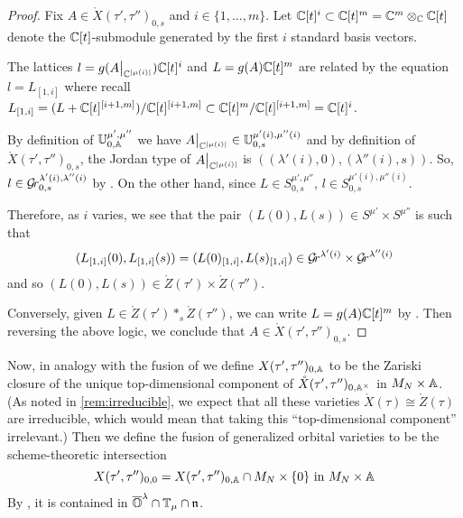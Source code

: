 \documentclass{article}
\begin{document}
\begin{proof}
% 
Fix $A\in \mathring X(\tau',\tau'')_{0,s} $ and $i \in \{1,\dots, m\}$. 
% 
Let $\CC[t]^i\subset\CC[t]^m = \CC^m\otimes_\CC\CC[t]$ denote the $\CC[t]$-submodule generated by the first $i$ standard basis vectors.

The lattices $l=g(A\big|_{\CC^{|\mu(i)|}})\CC[t]^i$ and $L=g(A)\CC[t]^m$ are related by the equation $ l = L_{[1,i]}$ where recall $L_{[1,i]} = (L + \CC[t]^{[i+1,m]}) / \CC[t]^{[i+1,m]}\subset \CC[t]^m/\CC[t]^{[i+1,m]} = \CC[t]^i$. 
    
By definition of $\UU^{\mu',\mu''}_{0,\AA}$ we have $A\big|_{\CC^{|\mu(i)|}}\in\UU^{\mu'(i),\mu''(i)}_{0,s}$ and by definition of $\mathring X(\tau',\tau'')_{0,s}$, the Jordan type of $A\big|_{\CC^{|\mu(i)|}}$ is $((\lambda'(i),0),(\lambda''(i),s))$. So, $l \in\Gr_{0,s}^{\lambda'(i),\lambda''(i)}$ by . 
On the other hand, since $L\in S^{\mu',\mu''}_{0,s}$, $l\in S^{\mu'(i),\mu''(i)}_{0,s}$. 

Therefore, as $i$ varies, we see that the pair $(L(0),L(s))\in S^{\mu'}\times S^{\mu''}$ is such that 
$$
    (L_{[1,i]}(0),L_{[1,i]}(s))  = (L(0)_{[1,i]},L(s)_{[1,i]}) \in \Gr^{\lambda'(i)}\times\Gr^{\lambda''(i)}
$$ 
and so $(L(0),L(s))\in \mathring Z(\tau')\times \mathring Z(\tau'')$. 

Conversely, given $L\in\mathring Z(\tau')\ast_s \mathring Z(\tau'')$, we can write $ L = g(A)\CC[t]^m$ by  . Then reversing the above logic, we conclude that $ A \in \mathring X(\tau',\tau'')_{0,s}$.
\end{proof}
% 

Now, in analogy with the fusion of  we define $X(\tau',\tau'')_{0,\AA}$ to be the Zariski closure of the unique top-dimensional component of $\mathring X(\tau',\tau'')_{0,\AA^\times}$ in $M_N \times\AA$.  (As noted in \cref{rem:irreducible}, we expect that all these varieties $ \mathring X(\tau) \cong \mathring Z(\tau) $ are irreducible, which would mean that taking this ``top-dimensional component'' irrelevant.)  Then we define the fusion of generalized orbital varieties to be the scheme-theoretic intersection 
$$ X(\tau', \tau'')_{0,0}  = X(\tau',\tau'')_{0,\AA} \cap M_N \times \{0\} \text{ in $M_N \times\AA$} $$
By , it is contained in $\overline\OO^\lambda\cap\TT_\mu\cap\n$. 
\end{document}
